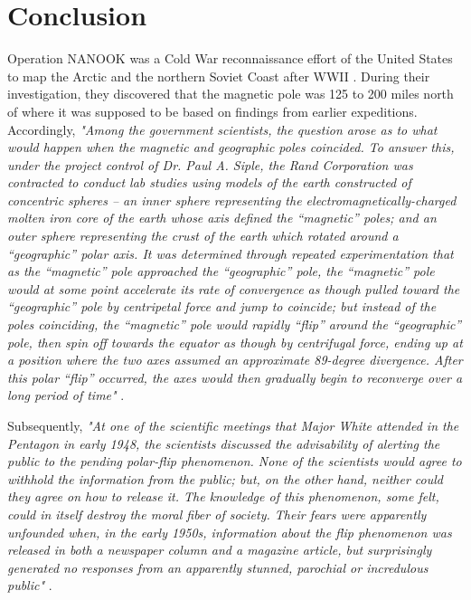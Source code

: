 \documentclass[10pt,twocolumn,letterpaper]{article}
\begin{document}
\section{Conclusion}

Operation NANOOK was a Cold War reconnaissance effort of the United States to map the Arctic and the northern Soviet Coast after WWII \cite{137}. During their investigation, they discovered that the magnetic pole was 125 to 200 miles north of where it was supposed to be based on findings from earlier expeditions. Accordingly, \textit{"Among the government scientists, the question arose as to what would happen when the magnetic and geographic poles coincided. To answer this, under the project control of Dr. Paul A. Siple, the Rand Corporation was contracted to conduct lab studies using models of the earth constructed of concentric spheres – an inner sphere representing the electromagnetically-charged molten iron core of the earth whose axis defined the “magnetic” poles; and an outer sphere representing the crust of the earth which rotated around a “geographic” polar axis. It was determined through repeated experimentation that as the “magnetic” pole approached the “geographic” pole, the “magnetic” pole would at some point accelerate its rate of convergence as though pulled toward the “geographic” pole by centripetal force and jump to coincide; but instead of the poles coinciding, the “magnetic” pole would rapidly “flip” around the “geographic” pole, then spin off towards the equator as though by centrifugal force, ending up at a position where the two axes assumed an approximate 89-degree divergence. After this polar “flip” occurred, the axes would then gradually begin to reconverge over a long period of time"} \cite{138,139}.

Subsequently, \textit{"At one of the scientific meetings that Major White attended in the Pentagon in early 1948, the scientists discussed the advisability of alerting the public to the pending polar-flip phenomenon. None of the scientists would agree to withhold the information from the public; but, on the other hand, neither could they agree on how to release it. The knowledge of this phenomenon, some felt, could in itself destroy the moral fiber of society. Their fears were apparently unfounded when, in the early 1950s, information about the flip phenomenon was released in both a newspaper column and a magazine article, but surprisingly generated no responses from an apparently stunned, parochial or incredulous public"} \cite{138,139}.
\end{document}
